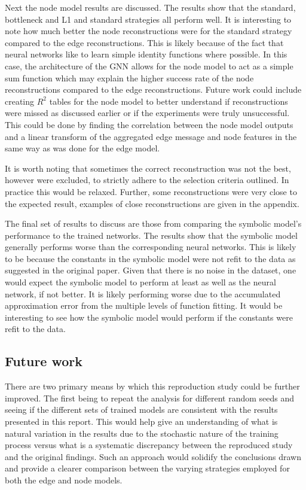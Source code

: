 \documentclass[11pt]{article}
\begin{document}
Next the node model results are discussed. The results show that the standard, bottleneck and L1 and standard strategies all perform well. It is interesting to note how much better the node reconstructions were for the standard strategy compared to the edge reconstructions. This is likely because of the fact that neural networks like to learn simple identity functions where possible. In this case, the architecture of the GNN allows for the node model to act as a simple sum function which may explain the higher success rate of the node reconstructions compared to the edge reconstructions. Future work could include creating $R^2$ tables for the node model to better understand if reconstructions were missed as discussed earlier or if the experiments were truly unsuccessful. This could be done by finding the correlation between the node model outputs and a linear transform of the aggregated edge message and node features in the same way as was done for the edge model.

It is worth noting that sometimes the correct reconstruction was not the best, however were excluded, to strictly adhere to the selection criteria outlined. In practice this would be relaxed. Further, some reconstructions were very close to the expected result, examples of close reconstructions are given in the appendix.

The final set of results to discuss are those from comparing the symbolic model's performance to the trained networks. The results show that the symbolic model generally performs worse than the corresponding neural networks. This is likely to be because the constants in the symbolic model were not refit to the data as suggested in the original paper. Given that there is no noise in the dataset, one would expect the symbolic model to perform at least as well as the neural network, if not better. It is likely performing worse due to the accumulated approximation error from the multiple levels of function fitting. It would be interesting to see how the symbolic model would perform if the constants were refit to the data.

\subsection{Future work}
    There are two primary means by which this reproduction study could be further improved. The first being to repeat the analysis for different random seeds and seeing if the different sets of trained models are consistent with the results presented in this report. This would help give an understanding of what is natural variation in the results due to the stochastic nature of the training process versus what is a systematic discrepancy between the reproduced study and the original findings. Such an approach would solidify the conclusions drawn and provide a clearer comparison between the varying strategies employed for both the edge and node models.
\end{document}
